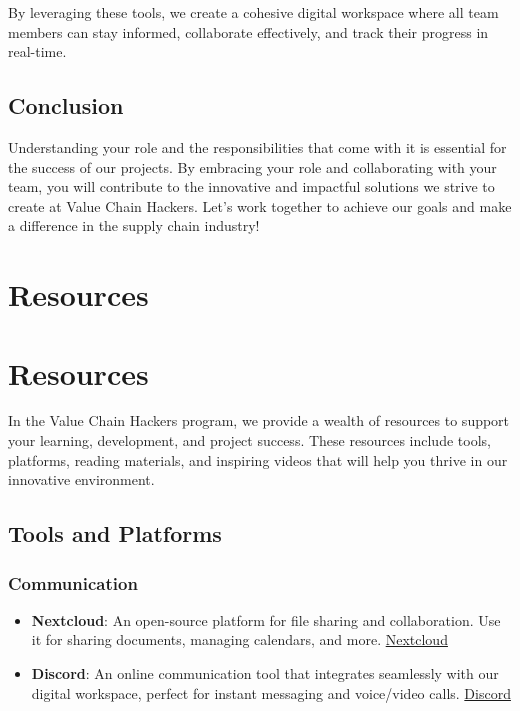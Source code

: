 \documentclass[
  letterpaper,
  DIV=11,
  numbers=noendperiod]{scrreprt}
\begin{document}
By leveraging these tools, we create a cohesive digital workspace where
all team members can stay informed, collaborate effectively, and track
their progress in real-time.

\section{Conclusion}\label{conclusion-5}

Understanding your role and the responsibilities that come with it is
essential for the success of our projects. By embracing your role and
collaborating with your team, you will contribute to the innovative and
impactful solutions we strive to create at Value Chain Hackers. Let's
work together to achieve our goals and make a difference in the supply
chain industry!


\chapter{Resources}\label{resources}


\chapter{Resources}\label{resources-1}

In the Value Chain Hackers program, we provide a wealth of resources to
support your learning, development, and project success. These resources
include tools, platforms, reading materials, and inspiring videos that
will help you thrive in our innovative environment.

\section{Tools and Platforms}\label{tools-and-platforms}

\subsection{Communication 📢}\label{communication-1}

\begin{itemize}
\item
  \textbf{Nextcloud}: An open-source platform for file sharing and
  collaboration. Use it for sharing documents, managing calendars, and
  more. \href{https://nextcloud.com/}{Nextcloud}
\item
  \textbf{Discord}: An online communication tool that integrates
  seamlessly with our digital workspace, perfect for instant messaging
  and voice/video calls. \href{https://discord.com/}{Discord}
\end{itemize}
\end{document}
